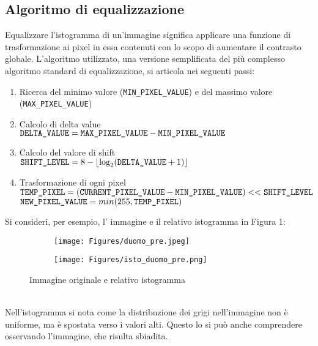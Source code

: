 \documentclass{article}
\begin{document}
\subsection{Algoritmo di equalizzazione} \label{subsection-ob-vel}
Equalizzare l’istogramma di un’immagine significa applicare una funzione di trasformazione ai pixel in essa contenuti con lo scopo di aumentare il contrasto globale.
L’algoritmo utilizzato, una versione semplificata del più complesso algoritmo standard di equalizzazione, si articola nei seguenti passi:
\vspace{3.5pt}
\begin{enumerate}
\item Ricerca del minimo valore (\verb^MIN_PIXEL_VALUE^) e del massimo valore (\verb^MAX_PIXEL_VALUE^) 
\item Calcolo di delta value 
\\$\verb^DELTA_VALUE^ = \verb^MAX_PIXEL_VALUE^ - \verb^MIN_PIXEL_VALUE^$
\item Calcolo del valore di shift
\\$\verb^SHIFT_LEVEL^ = 8 - \lfloor{\log_2 (\verb^DELTA_VALUE^ +1)}\rfloor $
\item Trasformazione di ogni pixel
\\$\verb^TEMP_PIXEL^ = (\verb^CURRENT_PIXEL_VALUE^ - \verb^MIN_PIXEL_VALUE^) << \verb^SHIFT_LEVEL^$
\\$\verb^NEW_PIXEL_VALUE^ = min (255, \verb^TEMP_PIXEL^)$
\end{enumerate}
\vspace{3.5pt}
Si consideri, per esempio, l' immagine e il relativo istogramma in Figura 1:
\begin{figure}[h]
\begin{subfigure}{0.4\textwidth}
\texttt{[image: Figures/duomo\_pre.jpeg]} 
\label{fig:subim1}
\end{subfigure}
\begin{subfigure}{0.6\textwidth}
\texttt{[image: Figures/isto\_duomo\_pre.png]}
\label{fig:subim2}
\end{subfigure}
\caption{Immagine originale e relativo istogramma}
\label{fig:image2}
\end{figure}
\vspace{3.5pt}
\\Nell’istogramma si nota come la distribuzione dei grigi nell’immagine non è uniforme, ma è spostata verso i valori alti. Questo lo si può anche comprendere osservando l'immagine, che risulta sbiadita. 
\end{document}
